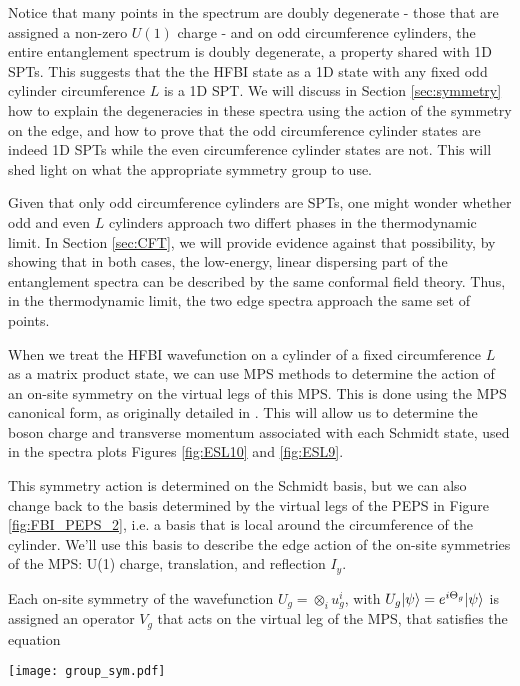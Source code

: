 Notice that many points in the spectrum are doubly degenerate - those that are
assigned a non-zero $U(1)$ charge - and on odd circumference cylinders, the
entire entanglement spectrum is doubly degenerate, a property shared with 1D SPTs. This suggests that the the HFBI state as a 1D state with any
fixed odd cylinder circumference $L$ is a 1D SPT. We will discuss in
Section \ref{sec:symmetry} how to explain the degeneracies in these spectra
using the action of the symmetry on the edge, and how to prove that the odd
circumference cylinder states are indeed 1D SPTs while the even circumference
cylinder states are not. This will shed light on what the appropriate symmetry
group to use.

Given that only odd circumference cylinders are SPTs, one might wonder whether
odd and even $L$ cylinders approach two differt phases in the thermodynamic
limit. In Section \ref{sec:CFT}, we will provide evidence against that
possibility, by showing that in both cases, the low-energy, linear dispersing
part of the entanglement spectra can be described by the same conformal field
theory. Thus, in the thermodynamic limit, the two edge spectra approach the
same set of points.

When we treat the HFBI wavefunction on a
cylinder of a fixed circumference $L$ as a matrix product state, we can use
MPS methods to determine the action of an on-site symmetry on
the virtual legs of this MPS. This is done using the MPS canonical form, as
originally detailed in \cite{perezgarcia2008}. This will allow us to determine
the boson charge and transverse momentum associated with each Schmidt state,
used in the spectra plots Figures \ref{fig:ESL10} and \ref{fig:ESL9}.

This symmetry action is determined on the Schmidt basis, but we can also
change back to the basis determined by the virtual legs of the PEPS in Figure
\ref{fig:FBI_PEPS_2}, i.e. a basis that is local around the circumference of
the cylinder. We'll use this basis to describe the edge action of the on-site
symmetries of the MPS: U(1) charge, translation, and reflection $I_y$.

Each on-site symmetry of the wavefunction $U_g = \otimes_i u^i_g$, with $U_g
\vert \psi \rangle = e^{i \Theta_g} \vert \psi \rangle$ is assigned an operator $V_g$ that
acts on the virtual leg of the MPS, that satisfies the equation
\begin{center}
\texttt{[image: group\_sym.pdf]}
\end{center}


